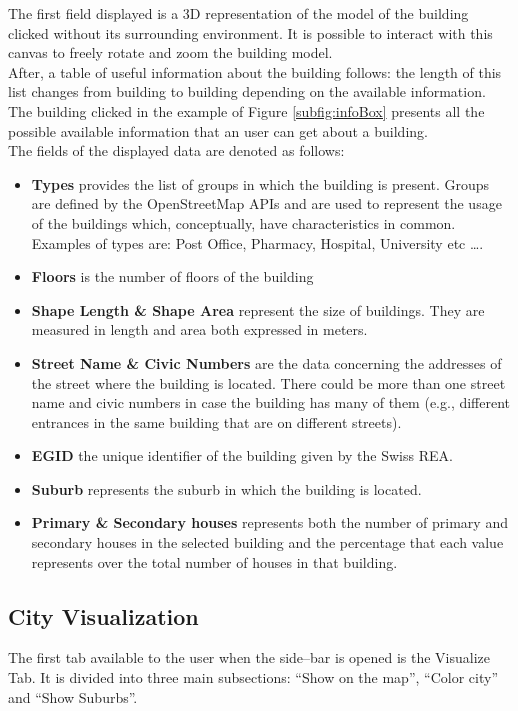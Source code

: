 The first field displayed is a 3D representation of the model of the building clicked without its surrounding environment. It is possible to interact with this canvas to freely rotate and zoom the building model.\\
After, a table of useful information about the building follows: the length of this list changes from building to building depending on the available information.\\
The building clicked in the example of Figure \ref{subfig:infoBox} presents all the possible available information that an user can get about a building.\\
The fields of the displayed data are denoted as follows: 
\begin{itemize}
\item {\bf Types} provides the list of groups in which the building is present. Groups are defined by the OpenStreetMap APIs and are used to represent the usage of the buildings which, conceptually, have characteristics in common. Examples of types are: Post Office, Pharmacy, Hospital, University etc \dots.
\item {\bf Floors} is the number of floors of the building
\item {\bf Shape Length \& Shape Area} represent the size of buildings. They are measured in length and area both expressed in meters.
\item {\bf Street Name \& Civic Numbers} are the data concerning the addresses of the street where the building is located. There could be more than one street name and civic numbers in case the building has many of them (e.g., different entrances in the same building that are on different streets). \item {\bf EGID} the unique identifier of the building given by the Swiss REA.
\item {\bf Suburb} represents the suburb in which the building is located.
\item {\bf Primary \& Secondary houses} represents both the number of primary and secondary houses in the selected building and the percentage that each value represents over the total number of houses in that building.
\end{itemize}

\subsection{City Visualization}
The first tab available to the user when the side--bar is opened is the Visualize Tab. It is divided into three main subsections: ``Show on the map'', ``Color city'' and ``Show Suburbs''.\\

